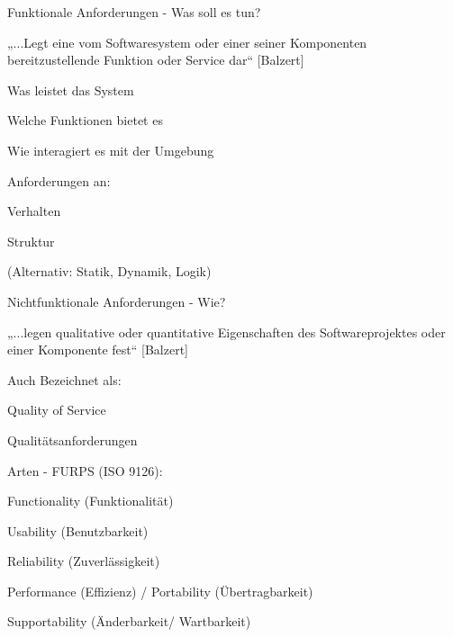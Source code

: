 \documentclass[a4paper]{article}
\begin{document}
\begin{multicols}{3}
  \begin{itemize*}
    \item Funktionale Anforderungen - Was soll es tun?
          \begin{itemize*}
            \item „...Legt eine vom Softwaresystem oder einer seiner Komponenten bereitzustellende Funktion oder Service dar“ [Balzert]
            \item Was leistet das System
            \item Welche Funktionen bietet es
            \item Wie interagiert es mit der Umgebung
            \item Anforderungen an:
                  \begin{itemize*}
                    \item Verhalten
                    \item Struktur
                    \item (Alternativ: Statik, Dynamik, Logik)
                  \end{itemize*}
          \end{itemize*}
    \item Nichtfunktionale Anforderungen - Wie?
          \begin{itemize*}
            \item „...legen qualitative oder quantitative Eigenschaften des Softwareprojektes oder einer Komponente fest“ [Balzert]
            \item Auch Bezeichnet als:
                  \begin{itemize*}
                    \item Quality of Service
                    \item Qualitätsanforderungen
                  \end{itemize*}
            \item Arten - FURPS (ISO 9126):
                  \begin{itemize*}
                    \item Functionality (Funktionalität)
                    \item Usability (Benutzbarkeit)
                    \item Reliability (Zuverlässigkeit)
                    \item Performance (Effizienz) / Portability (Übertragbarkeit)
                    \item Supportability (Änderbarkeit/ Wartbarkeit)
                  \end{itemize*}
          \end{itemize*}
  \end{itemize*}


\end{multicols}
\end{document}
